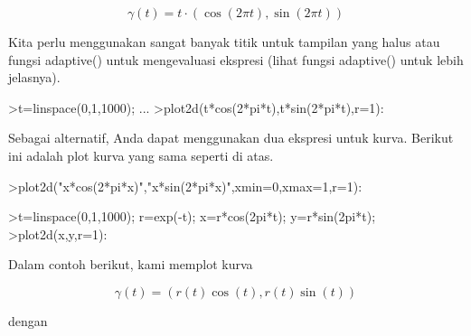 \documentclass[12pt,arial,letterpaper]{book}
\begin{document}
\begin{eulercomment}
\begin{eulercomment}
\begin{eulercomment}
\begin{eulercomment}
\begin{eulercomment}
\begin{eulercomment}
\begin{eulercomment}
\begin{eulercomment}
\begin{eulercomment}
\begin{eulercomment}
\begin{eulercomment}
\begin{eulercomment}
\begin{eulercomment}
\begin{eulercomment}
\begin{eulercomment}
\begin{eulercomment}
\begin{eulercomment}
\end{eulercomment}
\begin{eulerformula}
\[
\gamma(t) = t \cdot (\cos(2\pi t),\sin(2\pi t))
\]
\end{eulerformula}
\begin{eulercomment}
Kita perlu menggunakan sangat banyak titik untuk tampilan yang halus
atau fungsi adaptive() untuk mengevaluasi ekspresi (lihat fungsi
adaptive() untuk lebih jelasnya).
\end{eulercomment}
\begin{eulerprompt}
>t=linspace(0,1,1000); ...
>plot2d(t*cos(2*pi*t),t*sin(2*pi*t),r=1):
\end{eulerprompt}
\begin{eulercomment}
Sebagai alternatif, Anda dapat menggunakan dua ekspresi untuk kurva.
Berikut ini adalah plot kurva yang sama seperti di atas.
\end{eulercomment}
\begin{eulerprompt}
>plot2d("x*cos(2*pi*x)","x*sin(2*pi*x)",xmin=0,xmax=1,r=1):
\end{eulerprompt}
\begin{eulerprompt}
>t=linspace(0,1,1000); r=exp(-t); x=r*cos(2pi*t); y=r*sin(2pi*t);
>plot2d(x,y,r=1):
\end{eulerprompt}
\begin{eulercomment}
Dalam contoh berikut, kami memplot kurva

\end{eulercomment}
\begin{eulerformula}
\[
\gamma(t) = (r(t) \cos(t), r(t) \sin(t))
\]
\end{eulerformula}
\begin{eulercomment}
dengan


\end{eulercomment}
\end{eulercomment}
\end{eulercomment}
\end{eulercomment}
\end{eulercomment}
\end{eulercomment}
\end{eulercomment}
\end{eulercomment}
\end{eulercomment}
\end{eulercomment}
\end{eulercomment}
\end{eulercomment}
\end{eulercomment}
\end{eulercomment}
\end{eulercomment}
\end{eulercomment}
\end{eulercomment}
\end{document}
